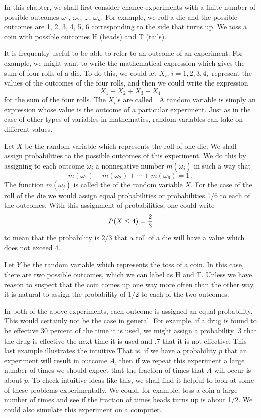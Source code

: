In this chapter, we shall first consider chance experiments with a finite number of
possible outcomes $\omega_1$, $\omega_2$, \dots, $\omega_n$.  For example, we
roll a die and the possible outcomes are 1, 2, 3, 4, 5, 6 corresponding to
the side that turns up.  We toss a coin with possible outcomes H (heads) and T
(tails).  
\par
It is frequently useful to be able to refer to an outcome of an experiment.  For 
example, we might want to write the mathematical expression which gives the sum of four rolls
of a die.  To do this, we could let $X_i$, $i = 1, 2, 3, 4,$ represent the values of the
outcomes of the four rolls, and then we could write the expression
$$X_1 + X_2 + X_3 + X_4$$
for the sum of the four rolls.  The $X_i$'s are called .
A random variable is simply an expression whose value is the outcome of a particular
experiment.  Just as in the case of other types of variables in mathematics, random variables
can take on different values.
\par
Let $X$ be the random variable which represents the roll of one die.  We shall assign
probabilities to the possible outcomes of this experiment.  We do this by assigning to each
outcome $\omega_j$ a nonnegative number $m(\omega_j)$ in such a way that
$$ 
m(\omega_1) + m(\omega_2) + \cdots + m(\omega_6) = 1\ .
$$
The function $m(\omega_j)$ is called the  of the random variable
$X$.  For the case of the roll of the die we would assign equal probabilities or
probabilities 1/6 to each of the outcomes.  With this assignment of probabilities, one could write
$$
P(X \le 4) = {2\over 3}
$$
to mean that the probability is $2/3$ that a roll of a die will have a value which does
not exceed 4.  
\par
Let $Y$ be the random variable which represents the toss of a coin.  In this case, there are
two possible outcomes, which we can label as H and T.  Unless we have reason to suspect that
the coin comes up one way more often than the other way, it is natural to assign the
probability of 1/2 to each of the two outcomes.
\par
In both of the above experiments, each outcome is assigned an equal probability.  This would certainly
not be the case in general.  For example, if a drug is found to be effective 30 percent of the time
it is used, we might assign a probability .3 that the drug is effective the next time it is used and
.7 that it is not effective.  This last example illustrates the intuitive   That is, if we have a probability $p$ that 
an experiment will result in outcome $A$, then if we repeat this experiment a large number of times 
we should expect that the
fraction of times that $A$ will occur is about $p$.  To check intuitive ideas like this, we shall
find it helpful to look at some of these problems experimentally.  We could, for 
example, toss a coin a large number of times and see if the fraction of times heads turns up is 
about 1/2.  We could also simulate this experiment on a computer.

